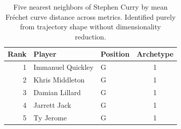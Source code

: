 \begin{table}[htbp]
  \centering\small
  \begin{tabular}{rllc}
    \toprule
    Rank & Player & Position & Archetype \\
    \midrule
    1 & Immanuel Quickley & G & 1 \\
    2 & Khris Middleton & G & 1 \\
    3 & Damian Lillard & G & 1 \\
    4 & Jarrett Jack & G & 1 \\
    5 & Ty Jerome & G & 1 \\
    \bottomrule
  \end{tabular}
  \caption{Five nearest neighbors of Stephen Curry by mean Fr\'{e}chet curve distance across metrics. Identified purely from trajectory shape without dimensionality reduction.}
  \label{tab:Stephen_Curry_frechet_curve_neighbors}
\end{table}

